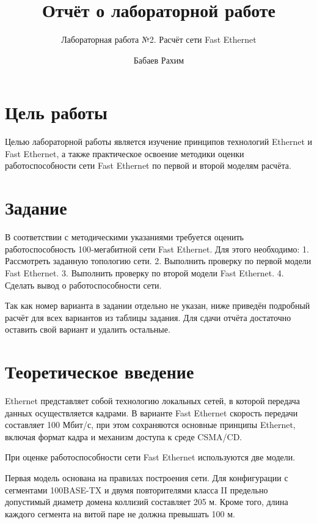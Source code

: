 \documentclass[
  english,
  russian,
  12pt,
  a4paper,
  DIV=11,
  numbers=noendperiod]{scrreprt}
\title{Отчёт о лабораторной работе}
\subtitle{Лабораторная работа №2. Расчёт сети Fast Ethernet}
\author{Бабаев Рахим}
\date{}
\renewcommand*\contentsname{Содержание}
\newcommand\contentsname{Содержание}
\begin{document}
\maketitle

\renewcommand*\contentsname{Содержание}
{
\setcounter{tocdepth}{1}
\tableofcontents
}
\listoffigures
\listoftables

\chapter{Цель
работы}\label{ux446ux435ux43bux44c-ux440ux430ux431ux43eux442ux44b}

Целью лабораторной работы является изучение принципов технологий
Ethernet и Fast Ethernet, а также практическое освоение методики оценки
работоспособности сети Fast Ethernet по первой и второй моделям расчёта.

\chapter{Задание}\label{ux437ux430ux434ux430ux43dux438ux435}

В соответствии с методическими указаниями требуется оценить
работоспособность 100‑мегабитной сети Fast Ethernet. Для этого
необходимо: 1. Рассмотреть заданную топологию сети. 2. Выполнить
проверку по первой модели Fast Ethernet. 3. Выполнить проверку по второй
модели Fast Ethernet. 4. Сделать вывод о работоспособности сети.

Так как номер варианта в задании отдельно не указан, ниже приведён
подробный расчёт для всех вариантов из таблицы задания. Для сдачи отчёта
достаточно оставить свой вариант и удалить остальные.

\chapter{Теоретическое
введение}\label{ux442ux435ux43eux440ux435ux442ux438ux447ux435ux441ux43aux43eux435-ux432ux432ux435ux434ux435ux43dux438ux435}

Ethernet представляет собой технологию локальных сетей, в которой
передача данных осуществляется кадрами. В варианте Fast Ethernet
скорость передачи составляет 100 Мбит/с, при этом сохраняются основные
принципы Ethernet, включая формат кадра и механизм доступа к среде
CSMA/CD.

При оценке работоспособности сети Fast Ethernet используются две модели.

Первая модель основана на правилах построения сети. Для конфигурации с
сегментами 100BASE-TX и двумя повторителями класса II предельно
допустимый диаметр домена коллизий составляет 205 м. Кроме того, длина
каждого сегмента на витой паре не должна превышать 100 м.
\end{document}
